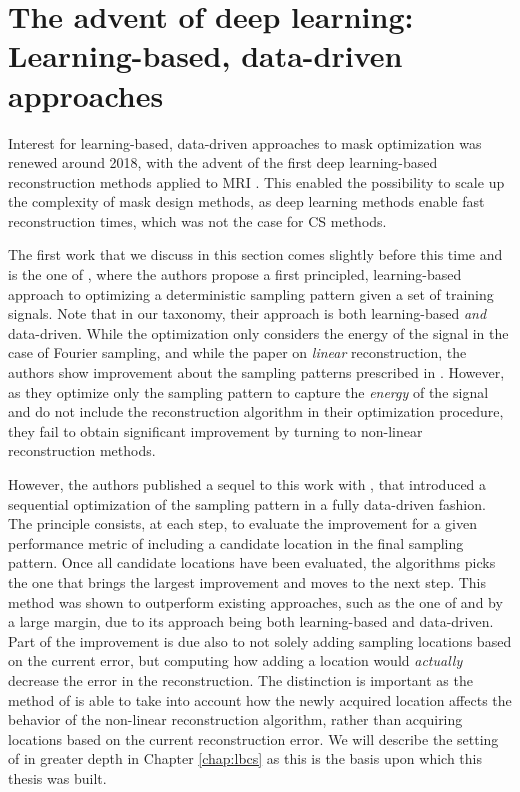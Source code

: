 \section{The advent of deep learning: Learning-based, data-driven approaches}

Interest for learning-based, data-driven approaches to mask optimization was renewed around 2018, with the advent of the first deep learning-based reconstruction methods applied to MRI \citep{sun2016deep,schlemper2017deep,mardani2018neural}. This enabled the possibility to scale up the complexity of mask design methods, as deep learning methods enable fast reconstruction times, which was not the case for CS methods. 

The first work that we discuss in this section comes slightly before this time and is the one of \citet{baldassarre2016learning}, where the authors propose a first principled, learning-based approach to optimizing a deterministic sampling pattern given a set of training signals. Note that in our taxonomy, their approach is both learning-based \textit{and} data-driven. While the optimization only considers the energy of the signal in the case of Fourier sampling, and while the paper on \textit{linear} reconstruction, the authors show improvement about the sampling patterns prescribed in \citet{lustig2007sparse,roman2014asymptotic}. However, as they optimize only the sampling pattern to capture the \textit{energy} of the signal and do not include the reconstruction algorithm in their optimization procedure, they fail to obtain significant improvement by turning to non-linear reconstruction methods. 

However, the authors published a sequel to this work with \citet{gozcu2018learning}, that introduced a sequential optimization of the sampling pattern in a fully data-driven fashion. The principle consists, at each step, to evaluate the improvement for a given performance metric of including a candidate location in the final sampling pattern. Once all candidate locations have been evaluated, the algorithms picks the one that brings the largest improvement and moves to the next step. This method was shown to outperform existing approaches, such as the one of \citet{lustig2007sparse} and \citet{knoll2011adapted} by a large margin, due to its approach being both learning-based and data-driven. Part of the improvement is due also to not solely adding sampling locations based on the current error, but computing how adding a location would \textit{actually} decrease the error in the reconstruction. The distinction is important as the method of \citet{gozcu2018learning} is able to take into account how the newly acquired location affects the behavior of the non-linear reconstruction algorithm, rather than acquiring locations based on the current reconstruction error. We will describe the setting of \citet{gozcu2018learning} in greater depth in Chapter \ref{chap:lbcs} as this is the basis upon which this thesis was built. 

